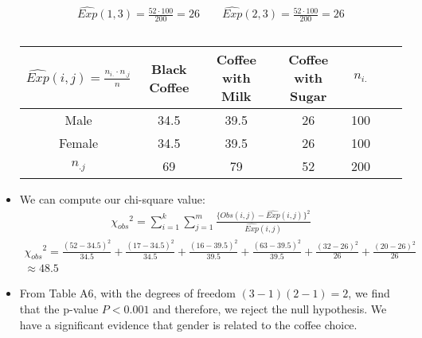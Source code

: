 \documentclass[12pt]{article}
\begin{document}
\begin{itemize}
\begin{equation*}
\begin{split}
            \widehat{Exp}(1,3) = \frac{52 \cdot 100}{200} = 26 \quad \quad \widehat{Exp}(2,3) = \frac{52 \cdot 100}{200} = 26 \\ \\
        \end{split}
    \end{equation*}
    \begin{table}[H]
        \small
        \centering
        \begin{tabular}{|c|c|c|c|c|c|c|}
        \hline
        $\widehat{Exp}(i,j) = \frac{n_{i.} \cdot n_{.j}}{n}$ & Black Coffee & Coffee with Milk & Coffee with Sugar & $n_{i.}$ \\
        \hline
        Male & 34.5 & 39.5 & 26 & 100\\
        Female & 34.5 & 39.5 & 26 & 100\\
        \hline
        $n_{.j}$ & 69 & 79 & 52 & 200\\
        \hline
        \end{tabular}
    \end{table}
    \item We can compute our chi-square value:
    \begin{equation*}
        \begin{split}
            {\chi_{obs}}^2 = \sum_{i = 1}^k\sum_{j = 1}^m \frac{\{ Obs(i,j) - \widehat{Exp}(i,j)\}^2 }{\widehat{Exp}(i,j)}
        \end{split}
    \end{equation*}
    \begin{equation*}
        \begin{split}
            {\chi_{obs}}^2 = \frac{(52 - 34.5)^2}{34.5} + \frac{(17 - 34.5)^2}{34.5} + \frac{(16 - 39.5)^2}{39.5} + \frac{(63 - 39.5)^2}{39.5} + \frac{(32 - 26)^2}{26} + \frac{(20 - 26)^2}{26}\\
            \approx 48.5
        \end{split}
    \end{equation*}
    \item From Table A6, with the degrees of freedom $(3-1)(2-1) = 2$, we find that the p-value $P < 0.001$ and therefore, we reject the null hypothesis. We have a significant evidence that gender is related to the coffee choice.
\end{itemize}
\end{document}

